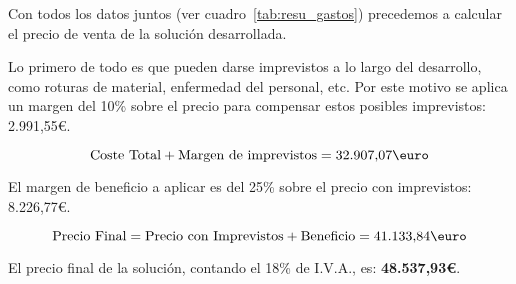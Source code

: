 Con todos los datos juntos (ver cuadro~\ref{tab:resu_gastos}) precedemos a calcular el precio de venta de la solución desarrollada.

Lo primero de todo es que pueden darse imprevistos a lo largo del desarrollo, como roturas de material, enfermedad del personal, etc. Por este motivo se aplica un margen del 10\% sobre el precio para compensar estos posibles imprevistos: 2.991,55\euro.

$$
\mbox{Coste Total} + \mbox{Margen de imprevistos} = \mbox{32.907,07\euro}
$$

El margen de beneficio a aplicar es del 25\% sobre el precio con imprevistos: 8.226,77\euro.

$$
	\mbox{Precio Final} = \mbox{Precio con Imprevistos} + \mbox{Beneficio} = \mbox{41.133,84\euro}
$$

El precio final de la solución, contando el 18\% de I.V.A., es: {\large \textbf{48.537,93\euro}}.